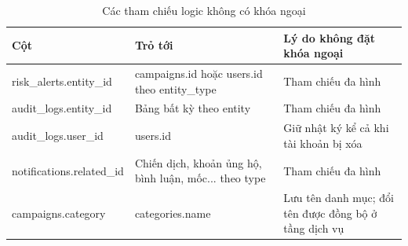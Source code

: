 \begin{table}[htbp]
    \centering
    \small
    \caption{Các tham chiếu logic không có khóa ngoại}
    \label{tab:tham_chieu_logic}
    \begin{tabularx}{\textwidth}{|P{4.0cm}|P{4.6cm}|X|}
        \hline
        \textbf{Cột} & \textbf{Trỏ tới} & \textbf{Lý do không đặt khóa ngoại} \\
        \hline
        risk\_\allowbreak{}alerts.entity\_\allowbreak{}id & campaigns.id hoặc users.id theo entity\_\allowbreak{}type & Tham chiếu đa hình \\
        \hline
        audit\_\allowbreak{}logs.entity\_\allowbreak{}id & Bảng bất kỳ theo entity & Tham chiếu đa hình \\
        \hline
        audit\_\allowbreak{}logs.user\_\allowbreak{}id & users.id & Giữ nhật ký kể cả khi tài khoản bị xóa \\
        \hline
        notifications.related\_\allowbreak{}id & Chiến dịch, khoản ủng hộ, bình luận, mốc... theo type & Tham chiếu đa hình \\
        \hline
        campaigns.category & categories.name & Lưu tên danh mục; đổi tên được đồng bộ ở tầng dịch vụ \\
        \hline
    \end{tabularx}
\end{table}
